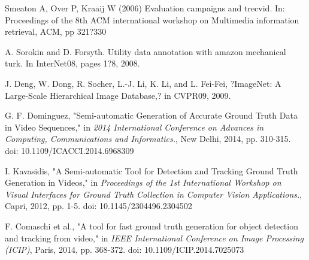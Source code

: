 \documentclass[conference]{IEEEtran}
\begin{document}
\begin{thebibliography}{9}
Smeaton A, Over P, Kraaij W (2006) Evaluation campaigns and trecvid. In: Proceedings of the 8th ACM international workshop on Multimedia information retrieval, ACM, pp 321?330

A. Sorokin and D. Forsyth. Utility data annotation with amazon mechanical turk. In InterNet08, pages 1?8, 2008.

J. Deng, W. Dong, R. Socher, L.-J. Li, K. Li, and L. Fei-Fei, ?ImageNet: A Large-Scale Hierarchical Image Database,? in CVPR09, 2009.

G. F. Dominguez, "Semi-automatic Generation of Accurate Ground Truth Data in Video Sequences," in 
\textit{2014 International Conference on Advances in Computing, Communications and Informatics.}, New Delhi, 2014, pp. 310-315. doi: 10.1109/ICACCI.2014.6968309

I. Kavasidis, "A Semi-automatic Tool for Detection and Tracking Ground Truth Generation in Videos," in \textit{Proceedings of the 1st International Workshop on Visual Interfaces for Ground Truth Collection in Computer Vision Applications.}, Capri, 2012, pp. 1-5. doi: 10.1145/2304496.2304502

F. Comaschi et al., "A tool for fast ground truth generation for object detection and tracking from video," in \textit{IEEE International Conference on Image Processing (ICIP)}, Paris, 2014, pp. 368-372. doi: 10.1109/ICIP.2014.7025073


\end{thebibliography}
\end{document}
